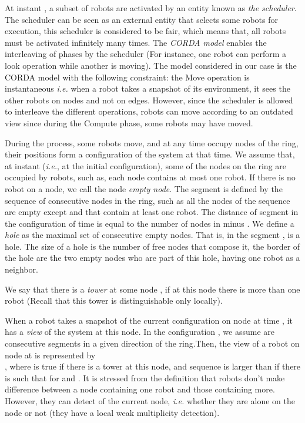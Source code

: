 \documentclass[11pt]{article}
\begin{document}
At instant , a subset of robots are activated by an entity known as \textit{the scheduler}.
The scheduler can be seen as an external entity that selects some robots for execution, this scheduler is considered to be fair, which means that, all robots must be activated infinitely many times. The \textit{CORDA model} \cite{Pre01} enables the interleaving of phases by the scheduler 
(For instance, one robot can perform a look operation while another is moving).
The model considered in our case is the CORDA model with the following constraint: the Move operation is instantaneous \textit{i.e.} when a robot takes a snapshot of its environment, it sees the other robots on nodes and not on edges. However, since the scheduler is allowed to interleave the different operations, robots can move according to an outdated view since during the Compute phase, some robots may have moved.

During the process, some robots move, and at any time occupy nodes of the ring, their positions form a configuration of the system at that time. 
We assume that, at instant  (\textit{i.e.}, at the initial configuration), some of the nodes on the ring are occupied by robots, such as, each node contains at most one robot. 
If there is no robot on a node, we call the node \textit{empty node}.
The segment  is defined by the sequence  of consecutive nodes in the ring, such as all the nodes of the sequence are empty except  and  that contain at least one robot.
The distance  of segment  in the configuration of time  is equal to the number of nodes in  minus .
We define a \textit{hole} as the maximal set of consecutive empty nodes. 
That is, in the segment ,  is a hole. 
The size of a hole is the number of free nodes that compose it, the border of the hole are the two empty nodes who are part of this hole, having one robot as a neighbor.

We say that there is a \textit{tower} at some node , if at this node there is more than one robot (Recall that this tower is distinguishable only locally). 

When a robot takes a snapshot of the current configuration on node  at time , it has a \textit{view} of the system at this node.
In the configuration , we assume  are consecutive segments in a given direction of the ring.Then, the view of a robot on node  at  is represented by \\, where
 is true if there is a tower at this node, and sequence  is larger than  if there is  such that  for  and .
It is stressed from the definition that robots don't make difference between a node containing one robot and those containing more. 
However, they can detect  of the current node, \textit{i.e.} whether they are alone on the node or not (they have a local weak multiplicity detection). 
\end{document}
